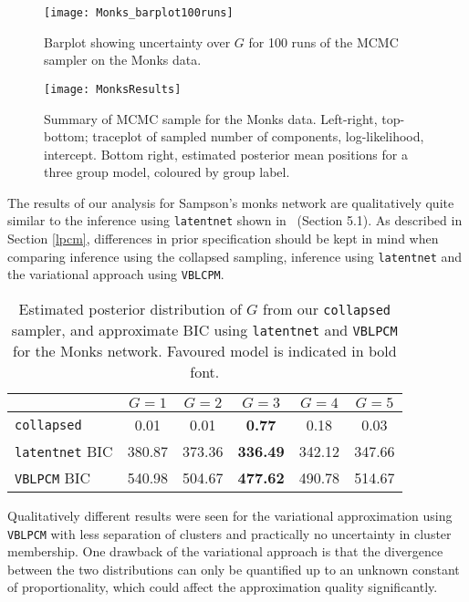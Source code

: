 \documentclass[12pt]{article}
\begin{document}
\begin{figure}
\begin{center}
\texttt{[image: Monks\_barplot100runs]}
\end{center}
\caption{Barplot showing uncertainty over $G$ for 100 runs of the MCMC sampler on the Monks data.} \label{fig:monkbarplot}
\end{figure}


\begin{figure}
\begin{center}
\texttt{[image: MonksResults]}
\end{center}
\caption{Summary of MCMC sample for the Monks data. Left-right, top-bottom; traceplot of sampled number of components, log-likelihood, intercept. Bottom right, estimated posterior mean positions for a three group model, coloured by group label.}\label{fig:monksres}
\end{figure}


The results of our analysis for Sampson's monks network are qualitatively quite similar to the inference using \texttt{latentnet} shown in~ (Section 5.1).
As described in Section \ref{lpcm}, differences in prior specification should be kept in mind when 
comparing inference using the collapsed sampling, inference using \texttt{latentnet} and the variational approach using \texttt{VBLCPM}.

\begin{table}[htp]
\begin{center}
\begin{tabular}{| l|c|c|c|c|c|}
\hline
 & $G=1$ & $G=2$ & $G=3$ & $G=4$ & $G=5$ \\
\hline
	\texttt{collapsed} & 0.01 & 0.01 & \bf{0.77} & 0.18 & 0.03 \\
  \texttt{latentnet} BIC & 380.87 & 373.36 & \bf{336.49} & 342.12 & 347.66 \\ 
  \texttt{VBLPCM} BIC & 540.98  & 504.67   & \bf{477.62}  & 490.78 & 514.67\\ 
  \hline
\end{tabular}
\caption{Estimated posterior distribution of $G$ from our \texttt{collapsed} sampler, and approximate BIC using \texttt{latentnet} and \texttt{VBLPCM} for the Monks network. Favoured model is indicated in bold font.}
\label{tab:pallmonks}
\end{center}
\end{table}

Qualitatively different results were seen for the variational approximation using \texttt{VBLPCM} 
with less separation of clusters and practically no uncertainty in cluster membership. One drawback of the variational approach is that the divergence 
between the two distributions can only be quantified up to an unknown constant of proportionality, which could affect the approximation quality significantly.
\end{document}

